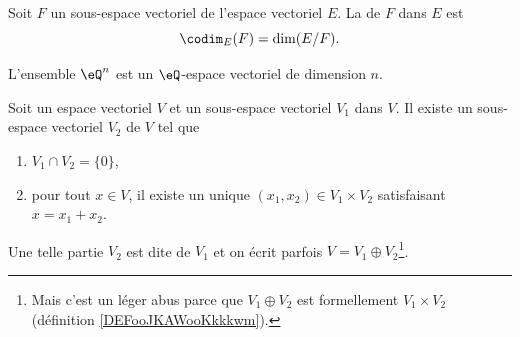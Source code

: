 \begin{definition}\label{DefCodimension}
	Soit \( F\) un sous-espace vectoriel de l'espace vectoriel \( E\). La  de \( F\) dans \( E\) est
	\begin{equation}
		\codim_E(F)=\dim(E/F).
	\end{equation}
\end{definition}

\begin{lemma}		\label{LEMooGNDPooAhvIek}
	L'ensemble \( \eQ^n\) est un \( \eQ\)-espace vectoriel de dimension \( n\).
\end{lemma}

\begin{propositionDef}	\label{PROPooRKOVooBFRCKq}
	Soit un espace vectoriel \( V\) et un sous-espace vectoriel \( V_1\) dans \( V\). Il existe un sous-espace vectoriel \( V_2\) de \( V\) tel que
	\begin{enumerate}
		\item
		      \( V_1\cap V_2=\{ 0 \}\),
		\item
		      pour tout \( x\in V\), il existe un unique \( (x_1,x_2)\in V_1\times V_2\) satisfaisant \( x=x_1+x_2\).
	\end{enumerate}

	Une telle partie \( V_2\) est dite  de \( V_1\) et on écrit parfois \( V=V_1\oplus V_2\)\footnote{Mais c'est un léger abus parce que \( V_1\oplus V_2\) est formellement \( V_1\times V_2\) (définition \ref{DEFooJKAWooKkkkwm}).}.
\end{propositionDef}

